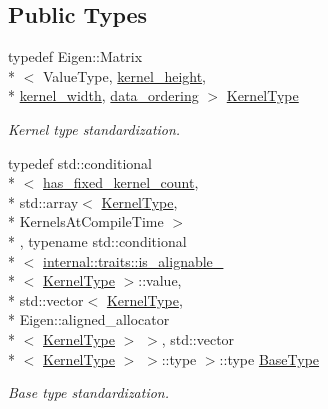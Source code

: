 \subsection*{Public Types}
\begin{DoxyCompactItemize}
\item 
typedef Eigen\-::\-Matrix\\*
$<$ Value\-Type, \hyperlink{structffnn_1_1layer_1_1convolution_1_1filter__traits_a9d152e933408a27b106afc8b413a6132}{kernel\-\_\-height}, \\*
\hyperlink{structffnn_1_1layer_1_1convolution_1_1filter__traits_adcec5284173f864350dc21be87ed9f1a}{kernel\-\_\-width}, \hyperlink{structffnn_1_1layer_1_1convolution_1_1filter__traits_a8ade103e54dc45f85bfea03c56470cd4}{data\-\_\-ordering} $>$ \hyperlink{structffnn_1_1layer_1_1convolution_1_1filter__traits_aaafe37da4f1d8e85681e791911c73116}{Kernel\-Type}
\begin{DoxyCompactList}\small\item\em Kernel type standardization. \end{DoxyCompactList}\item 
typedef std\-::conditional\\*
$<$ \hyperlink{structffnn_1_1layer_1_1convolution_1_1filter__traits_ad3ff87b2289f699c8d84e96eb35ebc2f}{has\-\_\-fixed\-\_\-kernel\-\_\-count}, \\*
std\-::array$<$ \hyperlink{structffnn_1_1layer_1_1convolution_1_1filter__traits_aaafe37da4f1d8e85681e791911c73116}{Kernel\-Type}, \\*
Kernels\-At\-Compile\-Time $>$\\*
, typename std\-::conditional\\*
$<$ \hyperlink{structffnn_1_1internal_1_1traits_1_1is__alignable__128}{internal\-::traits\-::is\-\_\-alignable\-\_}\\*
$<$ \hyperlink{structffnn_1_1layer_1_1convolution_1_1filter__traits_aaafe37da4f1d8e85681e791911c73116}{Kernel\-Type} $>$\-::value, \\*
std\-::vector$<$ \hyperlink{structffnn_1_1layer_1_1convolution_1_1filter__traits_aaafe37da4f1d8e85681e791911c73116}{Kernel\-Type}, \\*
Eigen\-::aligned\-\_\-allocator\\*
$<$ \hyperlink{structffnn_1_1layer_1_1convolution_1_1filter__traits_aaafe37da4f1d8e85681e791911c73116}{Kernel\-Type} $>$ $>$, std\-::vector\\*
$<$ \hyperlink{structffnn_1_1layer_1_1convolution_1_1filter__traits_aaafe37da4f1d8e85681e791911c73116}{Kernel\-Type} $>$ $>$\-::type $>$\-::type \hyperlink{structffnn_1_1layer_1_1convolution_1_1filter__traits_a102c142c78a1ff6c5063d807bcac1748}{Base\-Type}
\begin{DoxyCompactList}\small\item\em Base type standardization. \end{DoxyCompactList}\end{DoxyCompactItemize}
